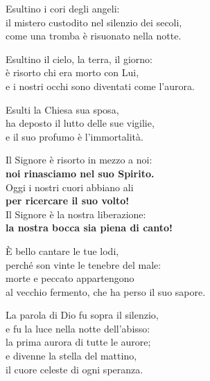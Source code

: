 
Esultino i cori degli angeli:\\
il mistero custodito nel silenzio dei secoli,\\
come una tromba è risuonato nella notte.

\spazio

Esultino il cielo, la terra, il giorno:\\
è risorto chi era morto con Lui,\\
e i nostri occhi sono diventati come l'aurora.

\spazio

Esulti la Chiesa sua sposa,\\
ha deposto il lutto delle sue vigilie,\\
e il suo profumo è l'immortalità.

\spazio

Il Signore è risorto in mezzo a noi:\\
\textbf{noi rinasciamo nel suo Spirito.}\\
Oggi i nostri cuori abbiano ali\\
\textbf{per ricercare il suo volto!}\\
Il Signore è la nostra liberazione:\\
\textbf{la nostra bocca sia piena di canto!}

\spazio

È bello cantare le tue lodi,\\
perché son vinte le tenebre del male:\\
morte e peccato appartengono\\
al vecchio fermento, che ha perso il suo sapore.

\spazio

 

\spazio

La parola di Dio fu sopra il silenzio,\\
e fu la luce nella notte dell'abisso:\\
la prima aurora di tutte le aurore;\\
e divenne la stella del mattino,\\
il cuore celeste di ogni speranza.

\spazio


\spazio

